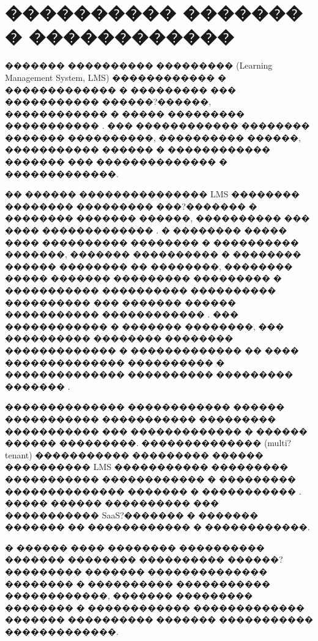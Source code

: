 \documentclass{G7-32}
\begin{document}

\newpage

\tableofcontents
\newpage

\makeatletter
\renewcommand{\thesection}{\arabic{section}}
\renewcommand{\@seccntformat}[1]{\csname the#1\endcsname\quad}
\makeatother

\setcounter{section}{0}

\section{���������� ������� � ������������}

������� ���������� ��������� (Learning Management System, LMS) ������������ � ������������� � ��������� ��� ����������� ������?������, ������������ � ����� ��������� ����������� \cite{moodle,openlms}. ��� ������������ �������� ������� ����������, ���������� ������, ����������� ������ � ������������ ������� ��� �������������� � �������������.

�� ������ ��������������� LMS �������� �������� ��������� ���?������� � �������� ������� ������, ���������� ��� ���� ������������� \cite{moodlecloud}. � �������� ����� ���� ���������� �������� � ���������� �������, ������� ���������� � �������� ������ �������� �� ��������, �������� ����� ������� ��������� ��������� � ����������� ���������� ���������� ���������� ��� ������� ������ ����������� ������������ \cite{mobile-learning-trends,mobile-lms-features}. ��� ������������ � ������� ��������, ��� ���������� �������� �������� ������������� � ������������� �� ���� �������������� ���������� � �������������� ���������� ��������� ������� \cite{docebo-adaptive,adaptive-edu,intelligent-adaptive}.

�������������� ������������ ������ ����������� ����������� ��������� ����������� ��� ������������� � ������ ������ ���������. �������������� (multi?tenant) ����������� ��������� ������ ���������� LMS ����������� ��������� ����������� ������������ � ��������� �������������� ������� � ����������� \cite{multi-tenant-guide,proprofsmultitenant,multitenant-moodle}. ����� ������ ���������� ��� ����������� SaaS?������� � ������� ������� �� ������������ � ������������.

� ������ ���� �������� ���������� ������� �������� ���������� ������?��������� ������� �������������� �������� � ���������� ����������� ������������, ������� ��������� �������� � ������������ ������������� ������� ���������� ������� ����������� �������������.
\end{document}
